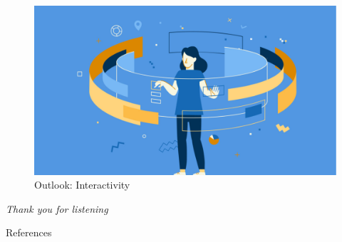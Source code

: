 \documentclass[en]{sdqbeamer}
\begin{document}
\begin{large}
\begin{frame}[plain]
        \begin{figure}[H]
            \centering
            \includegraphics[width=\linewidth,height=0.9\textheight,keepaspectratio]{images/Interactivity.jpg}
            \caption{Outlook: Interactivity \cite{das_2021}}
    \end{figure}
\end{frame}


\begin{frame}
  \centering \Huge
  \emph{Thank you for listening}
\end{frame}

\begin{frame}{References}

\printbibliography
\end{frame}

\end{large}
\end{document}
